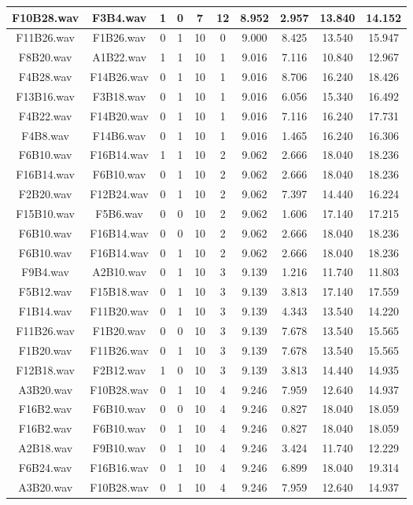 \documentclass[11pt,a4paper,twoside]{book}
\begin{document}
\begin{longtable}[c]{|c|c|c|c|c|c|c|c|c|c|}
F10B28.wav&F3B4.wav&1&0&7&12&8.952&2.957&13.840&14.152\\ \hline
F11B26.wav&F1B26.wav&0&1&10&0&9.000&8.425&13.540&15.947\\ \hline
F8B20.wav&A1B22.wav&1&1&10&1&9.016&7.116&10.840&12.967\\ \hline
F4B28.wav&F14B26.wav&0&1&10&1&9.016&8.706&16.240&18.426\\ \hline
F13B16.wav&F3B18.wav&0&1&10&1&9.016&6.056&15.340&16.492\\ \hline
F4B22.wav&F14B20.wav&0&1&10&1&9.016&7.116&16.240&17.731\\ \hline
F4B8.wav&F14B6.wav&0&1&10&1&9.016&1.465&16.240&16.306\\ \hline
F6B10.wav&F16B14.wav&1&1&10&2&9.062&2.666&18.040&18.236\\ \hline
F16B14.wav&F6B10.wav&0&1&10&2&9.062&2.666&18.040&18.236\\ \hline
F2B20.wav&F12B24.wav&0&1&10&2&9.062&7.397&14.440&16.224\\ \hline
F15B10.wav&F5B6.wav&0&0&10&2&9.062&1.606&17.140&17.215\\ \hline
F6B10.wav&F16B14.wav&0&0&10&2&9.062&2.666&18.040&18.236\\ \hline
F6B10.wav&F16B14.wav&0&1&10&2&9.062&2.666&18.040&18.236\\ \hline
F9B4.wav&A2B10.wav&0&1&10&3&9.139&1.216&11.740&11.803\\ \hline
F5B12.wav&F15B18.wav&0&1&10&3&9.139&3.813&17.140&17.559\\ \hline
F1B14.wav&F11B20.wav&0&1&10&3&9.139&4.343&13.540&14.220\\ \hline
F11B26.wav&F1B20.wav&0&0&10&3&9.139&7.678&13.540&15.565\\ \hline
F1B20.wav&F11B26.wav&0&1&10&3&9.139&7.678&13.540&15.565\\ \hline
F12B18.wav&F2B12.wav&1&0&10&3&9.139&3.813&14.440&14.935\\ \hline
A3B20.wav&F10B28.wav&0&1&10&4&9.246&7.959&12.640&14.937\\ \hline
F16B2.wav&F6B10.wav&0&0&10&4&9.246&0.827&18.040&18.059\\ \hline
F16B2.wav&F6B10.wav&0&1&10&4&9.246&0.827&18.040&18.059\\ \hline
A2B18.wav&F9B10.wav&0&1&10&4&9.246&3.424&11.740&12.229\\ \hline
F6B24.wav&F16B16.wav&0&1&10&4&9.246&6.899&18.040&19.314\\ \hline
A3B20.wav&F10B28.wav&0&1&10&4&9.246&7.959&12.640&14.937\\ \hline

\end{longtable}
\end{document}
